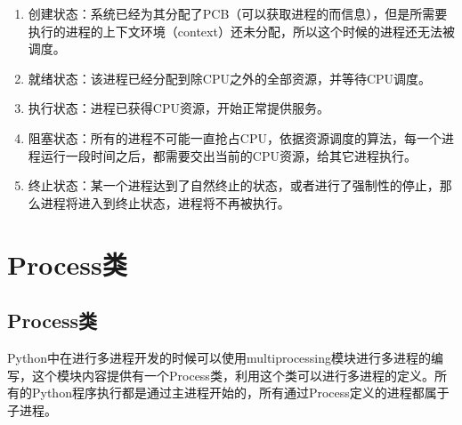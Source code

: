 \begin{enumerate}
	\item 创建状态：系统已经为其分配了PCB（可以获取进程的而信息），但是所需要执行的进程的上下文环境（context）还未分配，所以这个时候的进程还无法被调度。

	\item 就绪状态：该进程已经分配到除CPU之外的全部资源，并等待CPU调度。

	\item 执行状态：进程已获得CPU资源，开始正常提供服务。

	\item 阻塞状态：所有的进程不可能一直抢占CPU，依据资源调度的算法，每一个进程运行一段时间之后，都需要交出当前的CPU资源，给其它进程执行。

	\item 终止状态：某一个进程达到了自然终止的状态，或者进行了强制性的停止，那么进程将进入到终止状态，进程将不再被执行。
\end{enumerate}

\newpage

\section{Process类}

\subsection{Process类}

Python中在进行多进程开发的时候可以使用multiprocessing模块进行多进程的编写，这个模块内容提供有一个Process类，利用这个类可以进行多进程的定义。所有的Python程序执行都是通过主进程开始的，所有通过Process定义的进程都属于子进程。

\begin{table}[H]
	\centering
	\caption{Process类}
\end{table}

